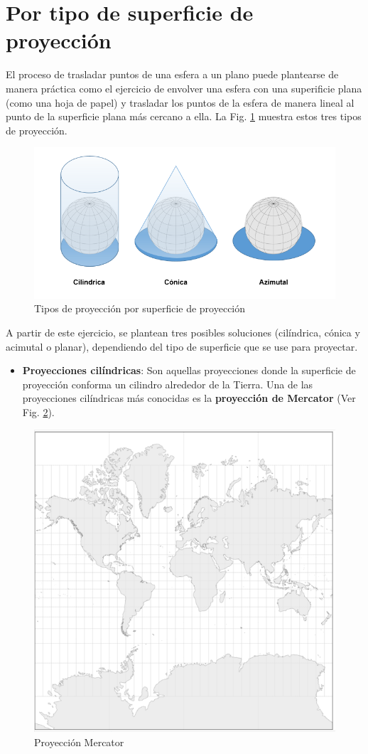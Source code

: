 \documentclass[
]{report}
\providecommand{\tightlist}{%
  \setlength{\itemsep}{0pt}\setlength{\parskip}{0pt}}
\begin{document}
\hypertarget{por-tipo-de-superficie-de-proyecciuxf3n}{%
\section{Por tipo de superficie de proyección}\label{por-tipo-de-superficie-de-proyecciuxf3n}}

El proceso de trasladar puntos de una esfera a un plano puede plantearse de
manera práctica como el ejercicio de envolver una esfera con una superificie
plana (como una hoja de papel) y trasladar los puntos de la esfera de manera
lineal al punto de la superficie plana más cercano a ella. La Fig.
\ref{fig:fi-proys} muestra estos tres tipos de proyección.

\begin{figure}

{\centering \includegraphics[width=0.6\linewidth]{img/tipos_proy} 

}

\caption{Tipos de proyección por superficie de proyección}\label{fig:fi-proys}
\end{figure}

A partir de este ejercicio, se plantean tres posibles soluciones (cilíndrica,
cónica y acimutal o planar), dependiendo del tipo de superficie que se use para
proyectar.

\begin{itemize}
\tightlist
\item
  \textbf{Proyecciones cilíndricas}: Son aquellas proyecciones donde la superficie
  de proyección conforma un cilindro alrededor de la Tierra. Una de las
  proyecciones cilíndricas más conocidas es la \textbf{proyección de Mercator} (Ver
  Fig. \ref{fig:mercator}).
\end{itemize}

\begin{figure}

{\centering \includegraphics[width=0.4\linewidth]{img/mercator} 

}

\caption{Proyección Mercator}\label{fig:mercator}
\end{figure}
\end{document}
